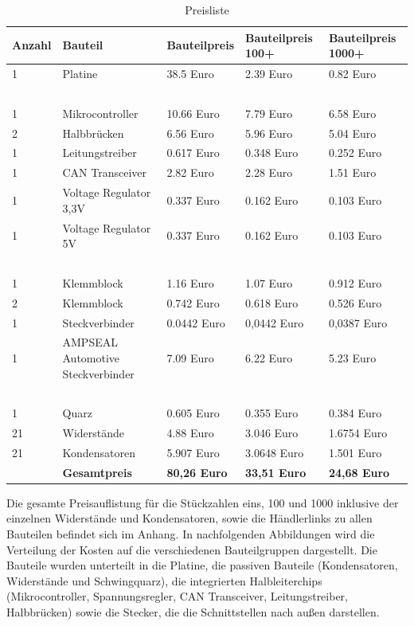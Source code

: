 \begin{table}[h]
	\centering
\begin{tabular}{ | l | l | l | l | l | }
\hline
	Anzahl & Bauteil & Bauteilpreis & Bauteilpreis 100+ & Bauteilpreis 1000+\\ \hline
	1 & Platine & 38.5 Euro & 2.39 Euro & 0.82 Euro\\
	\  & \  & \  & \  & \  \\
	1 & Mikrocontroller & 10.66 Euro & 7.79 Euro & 6.58 Euro \\
	2 & Halbbrücken & 6.56 Euro & 5.96 Euro & 5.04 Euro\\
	1 & Leitungstreiber & 0.617 Euro & 0.348 Euro & 0.252 Euro \\
	1 & CAN Transceiver & 2.82 Euro & 2.28 Euro & 1.51 Euro \\
	1 & Voltage Regulator 3,3V & 0.337 Euro & 0.162 Euro & 0.103 Euro \\
	1 & Voltage Regulator 5V & 0.337 Euro & 0.162 Euro & 0.103 Euro \\
	\  & \  & \  & \  & \  \\
	1 & Klemmblock & 1.16 Euro & 1.07 Euro & 0.912 Euro \\
	2 & Klemmblock & 0.742 Euro & 0.618 Euro & 0.526 Euro \\
	1 & Steckverbinder & 0.0442 Euro & 0,0442 Euro & 0,0387 Euro \\
	1 & AMPSEAL Automotive Steckverbinder & 7.09 Euro & 6.22 Euro & 5.23 Euro\\
	\  & \  & \  & \  & \  \\
	1 & Quarz & 0.605 Euro & 0.355 Euro & 0.384 Euro \\
	21 & Widerstände & 4.88 Euro & 3.046 Euro & 1.6754 Euro\\
	21 & Kondensatoren & 5.907 Euro & 3.0648 Euro & 1.501 Euro\\ \hline
	\  & \textbf{Gesamtpreis} & \textbf{80,26 Euro}  & \textbf{33,51 Euro}  & \textbf{24,68 Euro}  \\ \hline
\end{tabular}
\caption{Preisliste}
	\label{tab:Preisliste}
\end{table}

Die gesamte Preisauflistung für die Stückzahlen eins, 100 und 1000 inklusive der einzelnen Widerstände und Kondensatoren, sowie die Händlerlinks zu allen Bauteilen befindet sich im Anhang.
In nachfolgenden Abbildungen wird die Verteilung der Kosten auf die verschiedenen Bauteilgruppen dargestellt. Die Bauteile wurden unterteilt in die Platine, die passiven Bauteile (Kondensatoren, Widerstände und Schwingquarz), die integrierten Halbleiterchips (Mikrocontroller, Spannungsregler, CAN Transceiver, Leitungstreiber, Halbbrücken) sowie die Stecker, die die Schnittstellen nach außen darstellen. 

